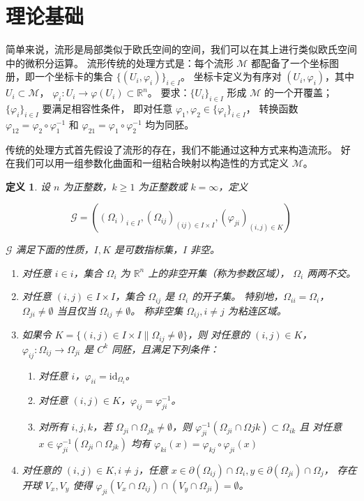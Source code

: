 \documentclass{ctexart}
\newtheorem{Def}{定义}
\begin{document}
\section{理论基础}
	简单来说，流形是局部类似于欧氏空间的空间，我们可以在其上进行类似欧氏空间中的微积分运算。
	流形传统的处理方式是：每个流形 $\mathcal{M}$ 都配备了一个坐标图册，即一个坐标卡的集合 $\{(U_i,\varphi_i)\}_{i\in I}$。
	坐标卡定义为有序对 $(U_i,\varphi_i)$，其中
	$U_i\subset \mathcal{M}$，
	$\varphi_i:U_i\rightarrow \varphi(U_i)\subset \mathbb{R}^n$。
	要求：$\{U_i\}_{i\in I}$ 形成 $\mathcal{M}$ 的一个开覆盖；
	$\{\varphi_i\}_{i\in I}$ 要满足相容性条件，
	即对任意 $\varphi_1,\varphi_2\in \{\varphi_i\}_{i\in I}$，
	转换函数 $\varphi_{12}=\varphi_2\circ \varphi_1^{-1}$ 和 $\varphi_{21}=\varphi_1\circ \varphi_2^{-1}$ 均为同胚。

	传统的处理方式首先假设了流形的存在，我们不能通过这种方式来构造流形。
	好在我们可以用一组参数化曲面和一组粘合映射以构造性的方式定义 $\mathcal{M}$。

	\begin{Def}\label{PGM-def}
		设 $n$ 为正整数，$k\geq 1$ 为正整数或 $k=\infty$，定义

		\begin{equation}
			\mathcal{G}=((\Omega_i)_{i\in I},(\Omega_{ij})_{(ij)\in I\times I},(\varphi_{ji})_{(i,j)\in K})
		\end{equation}

		$\mathcal{G}$ 满足下面的性质，$I,K$ 是可数指标集，$I$ 非空。

		\begin{enumerate}
			\item
				对任意 $i\in i$，集合 $\Omega_i$ 为 $\mathbb{R}^n$ 上的非空开集（称为参数区域），
				$\Omega_i$ 两两不交。
			\item
				对任意 $(i,j)\in I\times I$，集合 $\Omega_{ij}$ 是 $\Omega_i$ 的开子集。
				特别地，$\Omega_{ii}=\Omega_i$，$\Omega_{ji}\neq \emptyset$ 当且仅当 $\Omega_{ij}\neq \emptyset$。
				称非空集 $\Omega_{ij},i\neq j$ 为粘连区域。
			\item
				如果令 $K=\{(i,j)\in I\times I\|\Omega_{ij}\neq \emptyset\}$，则
				对任意的 $(i,j)\in K$，$\varphi_{ij}:\Omega_{ij}\rightarrow \Omega_{ji}$ 是 $C^k$ 同胚，且满足下列条件：
				\begin{enumerate}
					\item 对任意 $i$，$\varphi_{ii}=\text{id}_{\Omega_i}$。
					\item 对任意 $(i,j)\in K$，$\varphi_{ij}=\varphi_{ji}^{-1}$。
					\item
						对所有 $i,j,k$，若 $\Omega_{ji}\cap \Omega_{jk}\neq \emptyset$，则
						$\varphi_{ji}^{-1}(\Omega_{ji}\cap \Omega{jk})\subset \Omega_{ik}$ 且
						对任意 $x\in \varphi_{ji}^{-1}(\Omega_{ji}\cap \Omega_{jk})$ 均有 $\varphi_{ki}(x)=\varphi_{kj}\circ\varphi_{ji}(x)$ 
				\end{enumerate}
			\item
				对任意的 $(i,j)\in K,i\neq j$，任意 $x\in \partial(\Omega_{ij})\cap \Omega_i,y\in \partial(\Omega_{ji})\cap \Omega_j$，
				存在开球 $V_x,V_y$ 使得 $\varphi_{ji}(V_x\cap \Omega_{ij})\cap (V_y\cap \Omega_{ji})=\emptyset$。
		\end{enumerate}
	\end{Def}
\end{document}
